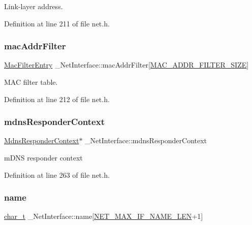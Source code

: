 Link-\/layer address. 



Definition at line 211 of file net.\+h.

\mbox{\label{struct__NetInterface_af6eaf334abb7ed0dac450614abe670ad}} 
\subsubsection{\texorpdfstring{mac\+Addr\+Filter}{macAddrFilter}}
{\footnotesize\ttfamily \hyperlink{structMacFilterEntry}{Mac\+Filter\+Entry} \+\_\+\+Net\+Interface\+::mac\+Addr\+Filter\mbox{[}\hyperlink{net__config_8h_ab64acae68b5723774fa272c62efd7c2b}{M\+A\+C\+\_\+\+A\+D\+D\+R\+\_\+\+F\+I\+L\+T\+E\+R\+\_\+\+S\+I\+ZE}\mbox{]}}



M\+AC filter table. 



Definition at line 212 of file net.\+h.

\mbox{\label{struct__NetInterface_a63996223c6fc702f52b30fea2aa2f6b7}} 
\subsubsection{\texorpdfstring{mdns\+Responder\+Context}{mdnsResponderContext}}
{\footnotesize\ttfamily \hyperlink{mdns__responder_8h_a568880b401f701b835db7d635fb0ea38}{Mdns\+Responder\+Context}$\ast$ \+\_\+\+Net\+Interface\+::mdns\+Responder\+Context}



m\+D\+NS responder context 



Definition at line 263 of file net.\+h.

\mbox{\label{struct__NetInterface_ab11ae4ef7d7767dd1ab2fbebbcb51e43}} 
\subsubsection{\texorpdfstring{name}{name}}
{\footnotesize\ttfamily \hyperlink{compiler__port_8h_a40bb5262bf908c328fbcfbe5d29d0201}{char\+\_\+t} \+\_\+\+Net\+Interface\+::name\mbox{[}\hyperlink{net_8h_a2064ee62d318037f2c1168cab858c852}{N\+E\+T\+\_\+\+M\+A\+X\+\_\+\+I\+F\+\_\+\+N\+A\+M\+E\+\_\+\+L\+EN}+1\mbox{]}}



